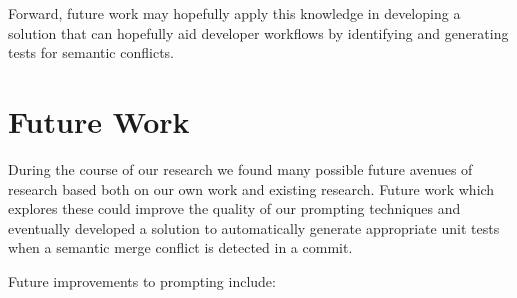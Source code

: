 Forward, future work may hopefully apply this knowledge in developing a solution that can hopefully aid developer workflows by identifying and generating tests for semantic conflicts.

\section{Future Work}

During the course of our research we found many possible future avenues of research based both on our own work and existing research. Future work which explores these could improve
the quality of our prompting techniques and eventually developed a solution to automatically generate appropriate unit tests when a semantic merge conflict is detected in a commit.

Future improvements to prompting include:

